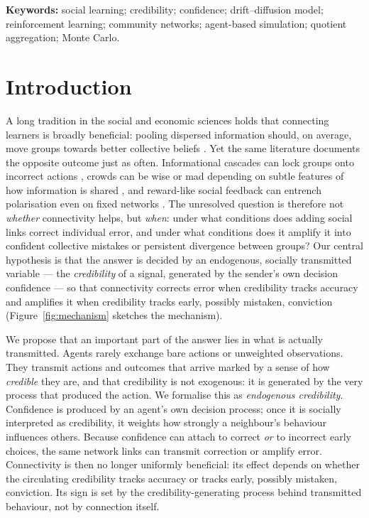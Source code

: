 \documentclass[11pt]{article}
\newcommand{\1}{\mathbf{1}}
\begin{document}
\noindent\textbf{Keywords:} social learning; credibility; confidence;
drift--diffusion model; reinforcement learning; community networks; agent-based
simulation; quotient aggregation; Monte Carlo.

\section{Introduction}

A long tradition in the social and economic sciences holds that connecting
learners is broadly beneficial: pooling dispersed information should, on
average, move groups towards better collective beliefs
\citep{DeGroot1974,GolubJackson2010}. Yet the same literature documents the
opposite outcome just as often. Informational cascades can lock groups onto
incorrect actions \citep{BikhchandaniHirshleiferWelch1992}, crowds can be wise
or mad depending on subtle features of how information is shared
\citep{TumpPleskacKurvers2020}, and reward-like social feedback can entrench
polarisation even on fixed networks \citep{HornBanischBatzdorferReitenbachSartoriSchwabeMas2026}.
The unresolved question is therefore not \emph{whether} connectivity helps, but
\emph{when}: under what conditions does adding social links correct individual
error, and under what conditions does it amplify it into confident collective
mistakes or persistent divergence between groups? Our central hypothesis is that
the answer is decided by an endogenous, socially transmitted variable --- the
\emph{credibility} of a signal, generated by the sender's own decision confidence
--- so that connectivity corrects error when credibility tracks accuracy and
amplifies it when credibility tracks early, possibly mistaken, conviction
(Figure~\ref{fig:mechanism} sketches the mechanism).

We propose that an important part of the answer lies in what is actually
transmitted. Agents rarely exchange bare actions or unweighted observations.
They transmit actions and outcomes that arrive marked by a sense of how
\emph{credible} they are, and that credibility is not exogenous: it is generated
by the very process that produced the action. We formalise this as
\emph{endogenous credibility}. Confidence is produced by an agent's own
decision process; once it is socially interpreted as credibility, it weights how
strongly a neighbour's behaviour influences others. Because confidence can
attach to correct \emph{or} to incorrect early choices, the same network links
can transmit correction or amplify error. Connectivity is then no longer
uniformly beneficial: its effect depends on whether the circulating credibility
tracks accuracy or tracks early, possibly mistaken, conviction. Its sign is set
by the credibility-generating process behind transmitted behaviour, not by
connection itself.
\end{document}
